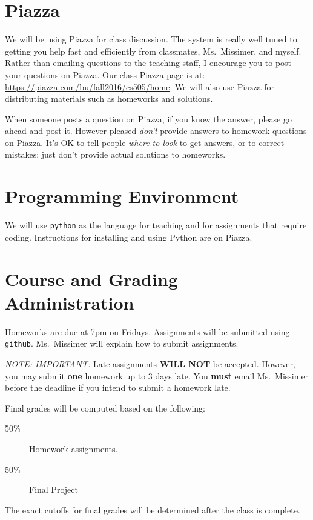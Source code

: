 \documentclass[11pt]{article}
\begin{document}
\section*{Piazza}

We will be using Piazza for class discussion. The system is really well
tuned to getting you help fast and efficiently from classmates, Ms.\ Missimer,
and myself. Rather than emailing questions to the teaching staff,
I encourage you to post your questions on Piazza.   Our class Piazza
page  is at: \url{https://piazza.com/bu/fall2016/cs505/home}. 
We will also use Piazza for distributing materials
such as homeworks and solutions.

When someone posts a question on Piazza, if you know the answer, please
go ahead and post it.   However pleased \emph{don't} provide answers to homework
questions on Piazza.   It's OK to tell people \emph{where to look} to
get answers, or to correct mistakes;  just don't provide actual solutions
to homeworks.

\section*{Programming Environment}

We will use \texttt{python} as the language for teaching and for
assignments that require coding.    Instructions for installing and
using Python are on Piazza.

\section*{Course and Grading Administration}

Homeworks are due at 7pm on Fridays.
Assignments will be submitted using \texttt{github}.   Ms.\ Missimer will
explain how to submit assignments.  

\emph{NOTE: IMPORTANT:} Late assignments \textbf{WILL NOT} be accepted. 
However, you may submit \textbf{one} homework up to 3 days late.   You
\textbf{must} email Ms.\ Missimer before the deadline if you intend to
submit a homework late. 

Final grades will be computed based on the following:
\begin{description}
\item[50\%] Homework assignments.  
\item[50\%] Final Project
\end{description}

The exact cutoffs for final grades will be determined after the class is
complete.
\end{document}
